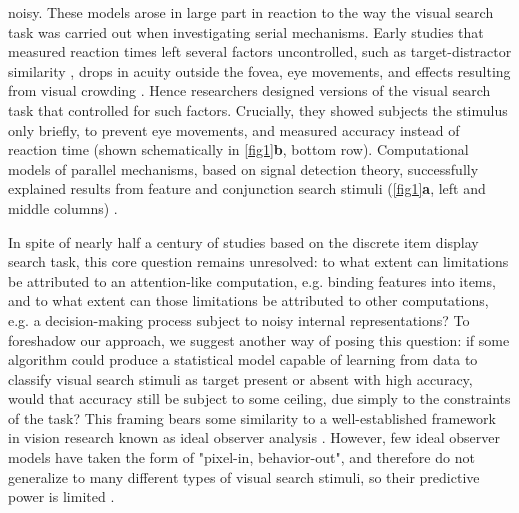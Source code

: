 \documentclass[10pt,letterpaper]{article}
\begin{document}
noisy. These models arose in large part in reaction 
to the way the visual search task was carried out when investigating
serial mechanisms. Early studies that measured reaction times left several factors 
uncontrolled, such as target-distractor similarity \cite{duncanVisualSearchStimulus1989}, 
drops in acuity outside the fovea, eye movements, and effects resulting from visual 
crowding \cite{ecksteinLowerVisualSearch1998a}. 
Hence researchers designed versions of the visual search task that controlled for such 
factors. Crucially, they showed subjects the 
stimulus only briefly, to prevent eye movements, and measured accuracy instead of reaction
time (shown schematically in \ref{fig1}\textbf{b}, bottom row). 
Computational models of parallel mechanisms, based on signal detection theory, 
successfully explained results from feature and conjunction search stimuli 
(\ref{fig1}\textbf{a}, left and middle columns) 
\cite{palmerPsychophysicsVisualSearch2000,ecksteinVisualSearchRetrospective2011}.

In spite of nearly half a century of studies based on the discrete item display search task,
this core question remains unresolved: to what extent can limitations be attributed to an attention-like 
computation, e.g. binding features into items, and to what extent can those limitations be 
attributed to other computations, e.g. a decision-making process subject to noisy internal representations?
To foreshadow our approach, we suggest another way of posing this question: 
if some algorithm could produce a statistical model capable of learning from data 
to classify visual search stimuli as target present or absent with high 
accuracy, would that accuracy still be subject to some ceiling, due simply to the 
constraints of the task? This framing bears some similarity to a 
well-established framework in vision research known as ideal observer analysis 
\cite{geislerIdealObserverAnalysis2003}. However, few ideal observer models have taken the 
form of "pixel-in, behavior-out", and therefore do not generalize to many 
different types of visual search stimuli, so their predictive power is limited 
\cite{geislerModelsOvertAttention2011}.
\end{document}
